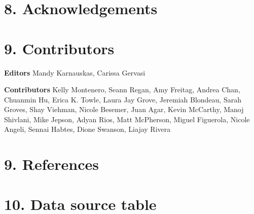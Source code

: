 \documentclass[
  letterpaper,
  oneside,
  open=any]{scrbook}
\begin{document}

\chapter{8. Acknowledgements}\label{acknowledgements}


\chapter{9. Contributors}\label{contributors}

\textbf{Editors} Mandy Karnauskas, Carissa Gervasi

\textbf{Contributors} Kelly Montenero, Seann Regan, Amy Freitag, Andrea
Chan, Chuanmin Hu, Erica K. Towle, Laura Jay Grove, Jeremiah Blondeau,
Sarah Groves, Shay Viehman, Nicole Besemer, Juan Agar, Kevin McCarthy,
Manoj Shivlani, Mike Jepson, Adyan Rios, Matt McPherson, Miguel
Figuerola, Nicole Angeli, Sennai Habtes, Dione Swanson, Liajay Rivera


\chapter{9. References}\label{references}


\chapter{10. Data source table}\label{data-source-table}


\backmatter
\end{document}
